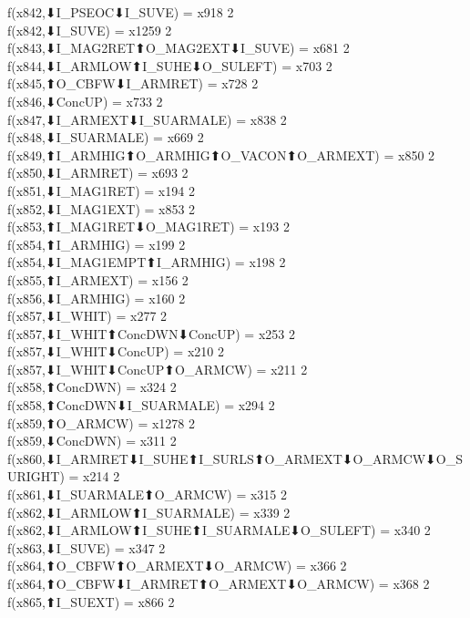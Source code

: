 f(x842,⬇I_PSEOC⬇I_SUVE) = x918 {2} \\
f(x842,⬇I_SUVE) = x1259 {2} \\
f(x843,⬇I_MAG2RET⬆O_MAG2EXT⬇I_SUVE) = x681 {2} \\
f(x844,⬇I_ARMLOW⬆I_SUHE⬇O_SULEFT) = x703 {2} \\
f(x845,⬆O_CBFW⬇I_ARMRET) = x728 {2} \\
f(x846,⬇ConcUP) = x733 {2} \\
f(x847,⬇I_ARMEXT⬇I_SUARMALE) = x838 {2} \\
f(x848,⬇I_SUARMALE) = x669 {2} \\
f(x849,⬆I_ARMHIG⬆O_ARMHIG⬆O_VACON⬆O_ARMEXT) = x850 {2} \\
f(x850,⬇I_ARMRET) = x693 {2} \\
f(x851,⬇I_MAG1RET) = x194 {2} \\
f(x852,⬇I_MAG1EXT) = x853 {2} \\
f(x853,⬆I_MAG1RET⬇O_MAG1RET) = x193 {2} \\
f(x854,⬆I_ARMHIG) = x199 {2} \\
f(x854,⬇I_MAG1EMPT⬆I_ARMHIG) = x198 {2} \\
f(x855,⬆I_ARMEXT) = x156 {2} \\
f(x856,⬇I_ARMHIG) = x160 {2} \\
f(x857,⬇I_WHIT) = x277 {2} \\
f(x857,⬇I_WHIT⬆ConcDWN⬇ConcUP) = x253 {2} \\
f(x857,⬇I_WHIT⬇ConcUP) = x210 {2} \\
f(x857,⬇I_WHIT⬇ConcUP⬆O_ARMCW) = x211 {2} \\
f(x858,⬆ConcDWN) = x324 {2} \\
f(x858,⬆ConcDWN⬇I_SUARMALE) = x294 {2} \\
f(x859,⬆O_ARMCW) = x1278 {2} \\
f(x859,⬇ConcDWN) = x311 {2} \\
f(x860,⬇I_ARMRET⬇I_SUHE⬆I_SURLS⬆O_ARMEXT⬇O_ARMCW⬇O_SURIGHT) = x214 {2} \\
f(x861,⬇I_SUARMALE⬆O_ARMCW) = x315 {2} \\
f(x862,⬇I_ARMLOW⬆I_SUARMALE) = x339 {2} \\
f(x862,⬇I_ARMLOW⬆I_SUHE⬆I_SUARMALE⬇O_SULEFT) = x340 {2} \\
f(x863,⬇I_SUVE) = x347 {2} \\
f(x864,⬆O_CBFW⬆O_ARMEXT⬇O_ARMCW) = x366 {2} \\
f(x864,⬆O_CBFW⬇I_ARMRET⬆O_ARMEXT⬇O_ARMCW) = x368 {2} \\
f(x865,⬆I_SUEXT) = x866 {2} \\
